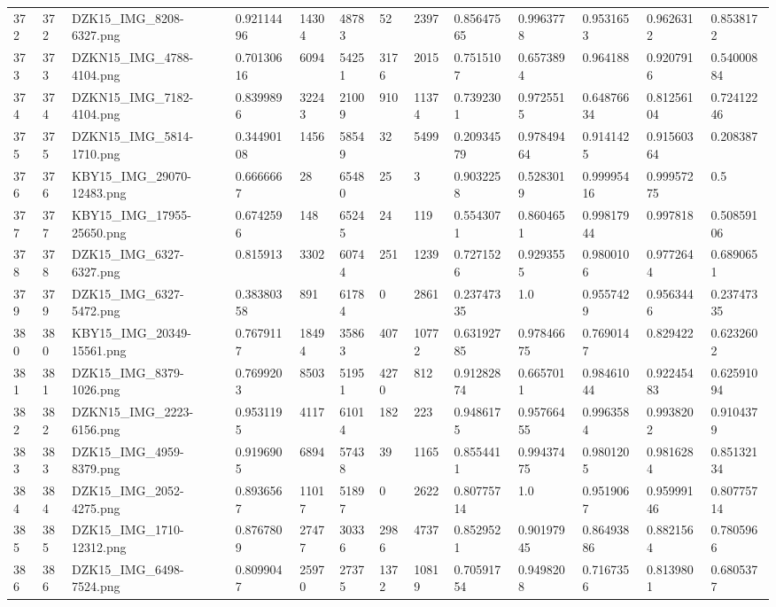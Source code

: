 \documentclass[11pt, a4paper, twoside]{report}
\begin{document}
\begin{longtable}[c]{@{}lllllllllllll@{}}
372 & 372 & DZK15\_IMG\_8208-6327.png & 0.92114496 & 14304 & 48783 & 52 & 2397 & 0.85647565 & 0.9963778 & 0.9531653 & 0.9626312 & 0.8538172 \\
373 & 373 & DZKN15\_IMG\_4788-4104.png & 0.70130616 & 6094 & 54251 & 3176 & 2015 & 0.7515107 & 0.6573894 & 0.964188 & 0.9207916 & 0.54000884 \\
374 & 374 & DZKN15\_IMG\_7182-4104.png & 0.8399896 & 32243 & 21009 & 910 & 11374 & 0.7392301 & 0.9725515 & 0.64876634 & 0.81256104 & 0.72412246 \\
375 & 375 & DZKN15\_IMG\_5814-1710.png & 0.34490108 & 1456 & 58549 & 32 & 5499 & 0.20934579 & 0.97849464 & 0.9141425 & 0.91560364 & 0.208387 \\
376 & 376 & KBY15\_IMG\_29070-12483.png & 0.6666667 & 28 & 65480 & 25 & 3 & 0.9032258 & 0.5283019 & 0.99995416 & 0.99957275 & 0.5 \\
377 & 377 & KBY15\_IMG\_17955-25650.png & 0.6742596 & 148 & 65245 & 24 & 119 & 0.5543071 & 0.8604651 & 0.99817944 & 0.997818 & 0.50859106 \\
378 & 378 & DZK15\_IMG\_6327-6327.png & 0.815913 & 3302 & 60744 & 251 & 1239 & 0.7271526 & 0.9293555 & 0.9800106 & 0.9772644 & 0.6890651 \\
379 & 379 & DZK15\_IMG\_6327-5472.png & 0.38380358 & 891 & 61784 & 0 & 2861 & 0.23747335 & 1.0 & 0.9557429 & 0.9563446 & 0.23747335 \\
380 & 380 & KBY15\_IMG\_20349-15561.png & 0.7679117 & 18494 & 35863 & 407 & 10772 & 0.63192785 & 0.97846675 & 0.7690147 & 0.829422 & 0.6232602 \\
381 & 381 & DZK15\_IMG\_8379-1026.png & 0.7699203 & 8503 & 51951 & 4270 & 812 & 0.91282874 & 0.6657011 & 0.98461044 & 0.92245483 & 0.62591094 \\
382 & 382 & DZKN15\_IMG\_2223-6156.png & 0.9531195 & 4117 & 61014 & 182 & 223 & 0.9486175 & 0.95766455 & 0.9963584 & 0.9938202 & 0.9104379 \\
383 & 383 & DZK15\_IMG\_4959-8379.png & 0.9196905 & 6894 & 57438 & 39 & 1165 & 0.8554411 & 0.99437475 & 0.9801205 & 0.9816284 & 0.85132134 \\
384 & 384 & DZK15\_IMG\_2052-4275.png & 0.8936567 & 11017 & 51897 & 0 & 2622 & 0.80775714 & 1.0 & 0.9519067 & 0.95999146 & 0.80775714 \\
385 & 385 & DZK15\_IMG\_1710-12312.png & 0.8767809 & 27477 & 30336 & 2986 & 4737 & 0.8529521 & 0.90197945 & 0.86493886 & 0.8821564 & 0.7805966 \\
386 & 386 & DZK15\_IMG\_6498-7524.png & 0.8099047 & 25970 & 27375 & 1372 & 10819 & 0.70591754 & 0.9498208 & 0.7167356 & 0.8139801 & 0.6805377 \\

\end{longtable}
\end{document}
